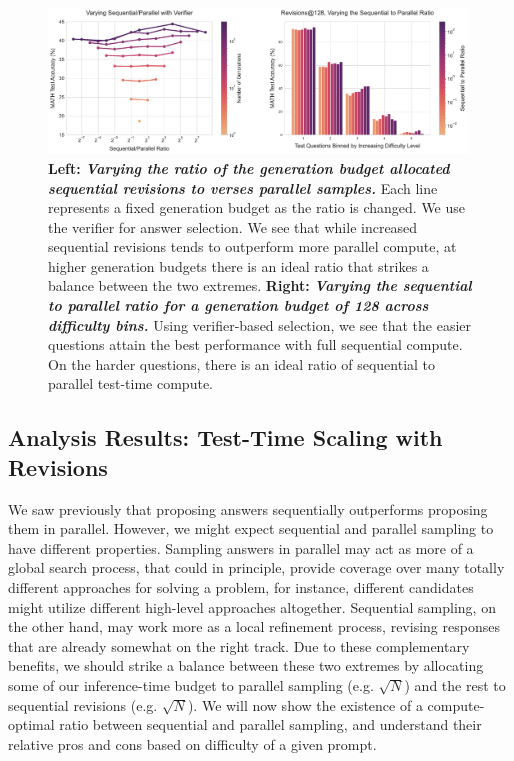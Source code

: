 \begin{figure}
    \centering
    \includegraphics[width=0.99\textwidth]{figures/revisions_varing_ratio_and_with_difficulty.pdf}
    \vspace{-0.3cm}
    \caption{\footnotesize{\textbf{Left:} \emph{\textbf{Varying the ratio of the generation budget allocated sequential revisions to verses parallel samples.}} Each line represents a fixed generation budget as the ratio is changed. We use the verifier for answer selection. We see that while increased sequential revisions tends to outperform more parallel compute, at higher generation budgets there is an ideal ratio that strikes a balance between the two extremes. \textbf{Right:} \textbf{\emph{Varying the sequential to parallel ratio for a generation budget of 128 across difficulty bins.}} Using verifier-based selection, we see that the easier questions attain the best performance with full sequential compute. On the harder questions, there is an ideal ratio of sequential to parallel test-time compute.}}
    \label{fig:iso_revisions}
    \vspace{-0.25cm}
\end{figure}
 
\vspace{-0.2cm}
\subsection{Analysis Results: Test-Time Scaling with Revisions}
\vspace{-0.2cm}

We saw previously that proposing answers sequentially outperforms proposing them in parallel. However, we might expect sequential and parallel sampling to have different properties.
Sampling answers in parallel may act as more of a global search process, that could in principle, provide coverage over many totally different approaches for solving a problem, for instance, different candidates might utilize different high-level approaches altogether.
Sequential sampling, on the other hand, may work more as a local refinement process, revising responses that are already somewhat on the right track.
Due to these complementary benefits, we should strike a balance between these two extremes by allocating some of our inference-time budget to parallel sampling (e.g. $\sqrt{N}$) and the rest to sequential revisions (e.g. $\sqrt{N}$). We will now show the existence of a compute-optimal ratio between sequential and parallel sampling, and understand their relative pros and cons based on difficulty of a given prompt.

